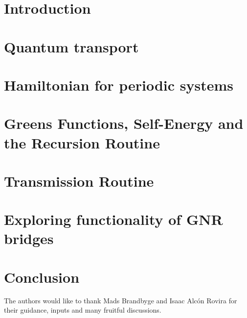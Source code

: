 \documentclass[aps, prb, a4paper, english, 12pt, onecolumn, longbibliography, amsmath, amssymb, colorinlistoftodos, floatfix, svgnames]{revtex4-2}
\numberwithin{equation}{section}
\begin{document}
\setcounter{page}{1}
\section{Introduction}
\newpage
\section{Quantum transport}\label{theorysec}

\section{Hamiltonian for periodic systems}\label{hamilsec}

\section{Greens Functions, Self-Energy and the Recursion Routine}\label{greensec}

\section{Transmission Routine}\label{transec}

\section{Exploring functionality of GNR bridges}\label{testsec}

\section{Conclusion}\label{Conc}

\begin{acknowledgments}
	The authors would like to thank Mads Brandbyge and Isaac Alcón Rovira for their guidance, inputs and many fruitful discussions.
\end{acknowledgments}
\onecolumngrid


\newpage
\listoffigures
\listoflistings
\newpage

\end{document}
